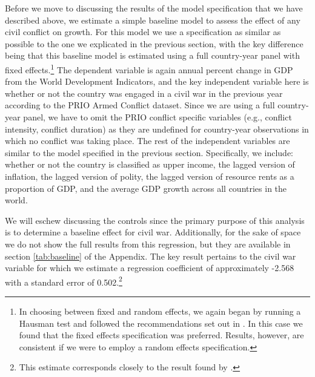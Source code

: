 Before we move to discussing the results of the model specification that we have described above, we estimate a simple baseline model to assess the effect of any civil conflict on growth. For this model we use a specification as similar as possible to the one we explicated in the previous section, with the key difference being that this baseline model is estimated using a full country-year panel with fixed effects.\footnote{In choosing between fixed and random effects, we again began by running a Hausman test and followed the recommendations set out in \citet{clark:linzer:2015}. In this case we found that the fixed effects specification was preferred. Results, however, are consistent if we were to employ a random effects specification.} The dependent variable is again annual percent change in GDP from the World Development Indicators, and the key independent variable here is whether or not the country was engaged in a civil war in the previous year according to the PRIO Armed Conflict dataset. Since we are using a full country-year panel, we have to omit the PRIO conflict specific variables (e.g., conflict intensity, conflict duration) as they are undefined for country-year observations in which no conflict was taking place. The rest of the independent variables are similar to the model specified in the previous section. Specifically, we include: whether or not the country is classified as upper income, the lagged version of inflation, the lagged version of polity, the lagged version of resource rents as a proportion of GDP, and the average GDP growth across all countries in the world. 


We will eschew discussing the controls since the primary purpose of this analysis is to determine a baseline effect for civil war. Additionally, for the sake of space we do not show the full results from this regression, but they are available in section \ref{tab:baseline} of the Appendix. The key result pertains to the civil war variable for which we estimate a regression coefficient of approximately -2.568 with a standard error of 0.502.\footnote{This estimate corresponds closely to the result found by \citet{collier:1999}.}

